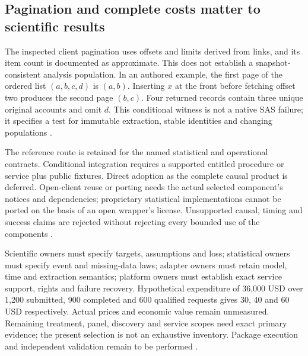 \subsection{Pagination and complete costs matter to scientific results}
The inspected client pagination uses offsets and limits derived from links,
and its item count is documented as approximate. This does not establish
a snapshot-consistent analysis population. In an authored example, the
first page of the ordered list $(a,b,c,d)$ is $(a,b)$. Inserting $x$ at the
front before fetching offset two produces the second page $(b,c)$. Four
returned records contain three unique original accounts and omit $d$.
This conditional witness is not a native SAS failure; it specifies a
test for immutable extraction, stable identities and changing populations
\citep{exec23_workflow_delegates_sasctl,exec24_sas_choice}.

The reference route is retained for the named statistical and operational
contracts. Conditional integration requires a supported entitled procedure
or service plus public fixtures. Direct adoption as the complete causal
product is deferred. Open-client reuse or porting needs the actual selected
component's notices and dependencies; proprietary statistical implementations
cannot be ported on the basis of an open wrapper's license. Unsupported
causal, timing and success claims are rejected without rejecting every
bounded use of the components \citep{exec24_sas_choice}.

Scientific owners must specify targets, assumptions and loss; statistical
owners must specify event and missing-data laws; adapter owners must retain
model, time and extraction semantics; platform owners must establish exact
service support, rights and failure recovery. Hypothetical expenditure of
36,000 USD over 1,200 submitted, 900 completed and 600 qualified requests
gives 30, 40 and 60 USD respectively. Actual prices and economic value
remain unmeasured. Remaining treatment, panel, discovery and service scopes
need exact primary evidence; the present selection is not an exhaustive
inventory. Package execution and independent validation remain to be performed \citep{exec24_sas_choice}.


